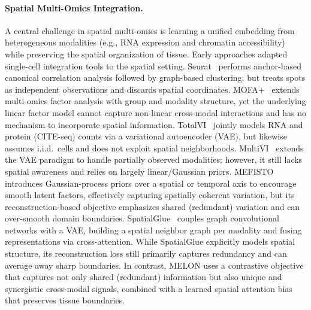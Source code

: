 \documentclass{article}
\theoremstyle{plain}
\theoremstyle{definition}
\begin{document}
\paragraph{Spatial Multi-Omics Integration.}
A central challenge in spatial multi-omics is learning a unified embedding from heterogeneous modalities (e.g., RNA expression and chromatin accessibility) while preserving the spatial organization of tissue. Early approaches adapted single-cell integration tools to the spatial setting. Seurat~\cite{hao2021seurat} performs anchor-based canonical correlation analysis followed by graph-based clustering, but treats spots as independent observations and discards spatial coordinates. MOFA+~\cite{argelaguet2020mofa} extends multi-omics factor analysis with group and modality structure, yet the underlying linear factor model cannot capture non-linear cross-modal interactions and has no mechanism to incorporate spatial information. TotalVI~\cite{gayoso2021totalvi} jointly models RNA and protein (CITE-seq) counts via a variational autoencoder (VAE), but likewise assumes i.i.d.\ cells and does not exploit spatial neighborhoods. MultiVI~\cite{ashuach2023multivi} extends the VAE paradigm to handle partially observed modalities; however, it still lacks spatial awareness and relies on largely linear/Gaussian priors. MEFISTO~\cite{velten2022mefisto} introduces Gaussian-process priors over a spatial or temporal axis to encourage smooth latent factors, effectively capturing spatially coherent variation, but its reconstruction-based objective emphasizes shared (redundant) variation and can over-smooth domain boundaries. SpatialGlue~\cite{long2024spatialglue} couples graph convolutional networks with a VAE, building a spatial neighbor graph per modality and fusing representations via cross-attention. While SpatialGlue explicitly models spatial structure, its reconstruction loss still primarily captures redundancy and can average away sharp boundaries. In contrast, MELON uses a contrastive objective that captures not only shared (redundant) information but also unique and synergistic cross-modal signals, combined with a learned spatial attention bias that preserves tissue boundaries.
\end{document}
